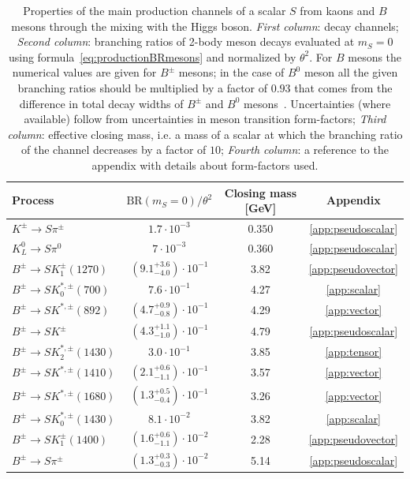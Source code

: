 \documentclass[a4paper,12pt,dvipsnames,usernames]{article}
\begin{document}
\begin{table}[t!]
\centering
\begin{tabular}{|l|c|c|c|}
 \hline  
 Process  & $\text{BR}(m_S=0)/\theta^2$& Closing mass [GeV] & Appendix\\
 \hline
 $K^\pm\to S\pi^{\pm}$ & $1.7 \cdot 10^{-3}$ & $0.350$ & \ref{app:pseudoscalar}\\ \hline
 $K^0_L\to S\pi^0$ & $7 \cdot 10^{-3}$ & $0.360$ & \ref{app:pseudoscalar}\\ \hline
  $B^{\pm} \to S K^{\pm}_{1}(1270)$ & $(9.1^{+3.6}_{-4.0})\cdot 10^{-1}$ & 3.82 & \ref{app:pseudovector}\\ \hline
  $B^{\pm} \to S K^{*,\pm}_{0}(700)$ & $7.6\cdot 10^{-1}$ & 4.27 & \ref{app:scalar}\\ \hline
  $B^{\pm} \to S K^{*,\pm}(892)$ & $(4.7^{+0.9}_{-0.8})\cdot 10^{-1}$ & 4.29 & \ref{app:vector}\\ \hline
  $B^{\pm} \to S K^{\pm}$ & $(4.3^{+1.1}_{-1.0})\cdot 10^{-1}$ & 4.79 & \ref{app:pseudoscalar} \\ \hline
  $B^{\pm} \to S K^{*,\pm}_{2}(1430)$ & $3.0\cdot 10^{-1}$ & 3.85 & \ref{app:tensor}\\ \hline
  $B^{\pm} \to S K^{*,\pm}(1410)$ & $(2.1^{+0.6}_{-1.1})\cdot 10^{-1}$ & 3.57 & \ref{app:vector}\\ \hline
  $B^{\pm} \to S K^{*,\pm}(1680)$ & $(1.3^{+0.5}_{-0.4})\cdot 10^{-1}$ & 3.26 & \ref{app:vector}\\ \hline
  $B^{\pm} \to S K^{*,\pm}_{0}(1430)$ & $8.1\cdot 10^{-2}$ & 3.82 & \ref{app:scalar}\\ \hline
  $B^{\pm} \to S K^{\pm}_{1}(1400)$ & $(1.6^{+0.6}_{-1.1})\cdot 10^{-2}$ & 2.28 &\ref{app:pseudovector}\\ \hline
  $B^{\pm} \to S \pi^{\pm}$ & $(1.3^{+0.3}_{-0.3})\cdot 10^{-2}$ & 5.14 & \ref{app:pseudoscalar}\\ \hline
\end{tabular}
    \caption{Properties of the main production channels of a scalar $S$ from kaons and $B$ mesons through the mixing with the Higgs boson. \textit{First column}: decay channels; \textit{Second column}: branching ratios of 2-body meson decays evaluated at $m_{S}=0$ using formula~\eqref{eq:productionBRmesons} and normalized by $\theta^2$. For $B$ mesons the numerical values are given for $B^{\pm}$ mesons; in the case of $B^0$ meson all the given branching ratios should be multiplied by a factor of $0.93$ that comes from the difference in total decay widths of $B^{\pm}$ and $B^0$ mesons~\cite{Tanabashi:2018oca}. Uncertainties (where available) follow from uncertainties in meson transition form-factors; \textit{Third column}: effective closing mass, i.e. a mass of a scalar at which the branching ratio of the channel decreases by a factor of $10$; \textit{Fourth column}: a reference to the appendix with details about form-factors used.}
    \label{tab:BR}
\end{table}
\end{document}
